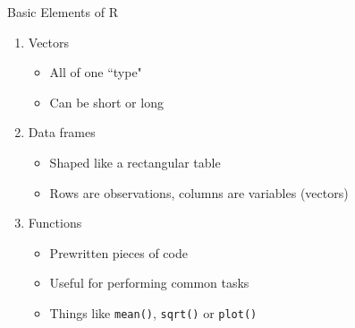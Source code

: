 \documentclass{beamer}
\begin{document}
\begin{frame}{Basic Elements of R}
\begin{enumerate}
\item Vectors
	\begin{itemize}
	\item All of one ``type"
	\item Can be short or long
	\end{itemize}
\item Data frames
	\begin{itemize}
	\item Shaped like a rectangular table
	\item Rows are observations, columns are variables (vectors)
	\end{itemize}
\item Functions
	\begin{itemize}
	\item Prewritten pieces of code
	\item Useful for performing common tasks
	\item Things like \texttt{mean()}, \texttt{sqrt()} or \texttt{plot()}
	\end{itemize}
\end{enumerate}
\end{frame}
\end{document}
